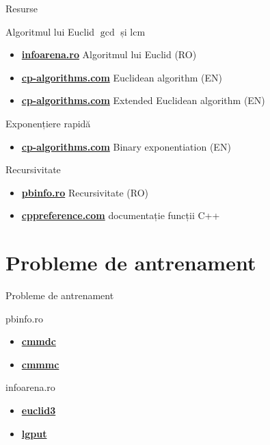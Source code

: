 \documentclass{beamer}
\begin{document}
\begin{frame}{Resurse}
  \begin{block}{Algoritmul lui Euclid \textemdash{} $\gcd$ și $\text{lcm}$}
    \begin{itemize}
      \item \href{https://www.infoarena.ro/algoritmul-lui-euclid}{\textbf{infoarena.ro}} \textemdash{} Algoritmul lui Euclid (RO)
      \item \href{https://cp-algorithms.com/algebra/euclid-algorithm.html}{\textbf{cp-algorithms.com}} \textemdash{} Euclidean algorithm (EN)
      \item \href{https://cp-algorithms.com/algebra/extended-euclid-algorithm.html}{\textbf{cp-algorithms.com}} \textemdash{} Extended Euclidean algorithm (EN)
    \end{itemize}
  \end{block}
  \begin{block}{Exponențiere rapidă}
    \begin{itemize}
      \item \href{https://cp-algorithms.com/algebra/binary-exp.html}{\textbf{cp-algorithms.com}} \textemdash{} Binary exponentiation (EN)
    \end{itemize}
  \end{block}
  \begin{block}{Recursivitate}
    \begin{itemize}
      \item \href{https://www.pbinfo.ro/articole/3873/recursivitate}{\textbf{pbinfo.ro}} \textemdash{} Recursivitate (RO)
      \item \href{https://cppreference.com}{\textbf{cppreference.com}} \textemdash{} documentație funcții C++
    \end{itemize}
  \end{block}
\end{frame}

\section{Probleme de antrenament}

\begin{frame}{Probleme de antrenament}
  \begin{block}{pbinfo.ro}
    \begin{itemize}
      \item \href{https://www.pbinfo.ro/probleme/58/cmmdc}{\textbf{cmmdc}}
      \item \href{https://www.pbinfo.ro/probleme/59/cmmmc}{\textbf{cmmmc}}
    \end{itemize}
  \end{block}
  \begin{block}{infoarena.ro}
    \begin{itemize}
      \item \href{https://www.infoarena.ro/problema/euclid3}{\textbf{euclid3}}
      \item \href{https://infoarena.ro/problema/lgput}{\textbf{lgput}}
    \end{itemize}
  \end{block}
\end{frame}
\end{document}
